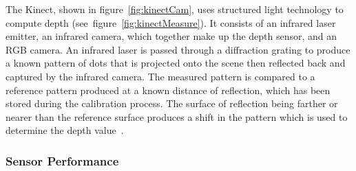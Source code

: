\documentclass[11pt]{article} %
\begin{document}
The Kinect, shown in figure~\ref{fig:kinectCam}, uses structured light technology to compute depth (see~figure~\ref{fig:kinectMeasure}). It consists of an infrared laser emitter, an infrared camera, which together make up the depth sensor, and an RGB camera. An infrared laser is passed through a diffraction grating to produce a known pattern of dots that is projected onto the scene then reflected back and captured by the infrared camera. The measured pattern is compared to a reference pattern produced at a known distance of reflection, which has been stored during the calibration process. The surface of reflection being farther or nearer than the reference surface produces a shift in the pattern which is used to determine the depth value~\cite{Zhang2012a,Khoshelham2012a}.
\begin{figure}
\centering
{}%
\qquad
{}%
\caption{}
\label{fig:kinect}
\end{figure}

\subsubsection{Sensor Performance}
\label{sec:senPerf}
\end{document}
